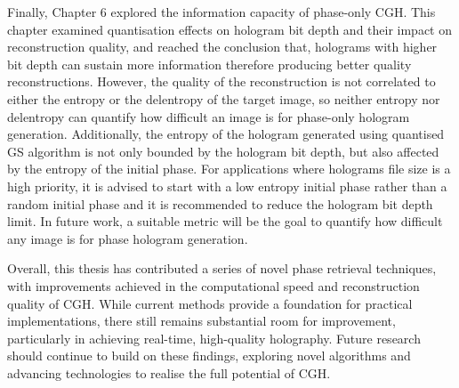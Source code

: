 Finally, Chapter 6 explored the information capacity of phase-only CGH. This chapter examined quantisation effects on hologram bit depth and their impact on reconstruction quality, and reached the conclusion that, holograms with higher bit depth can sustain more information therefore producing better quality reconstructions. However, the quality of the reconstruction is not correlated to either the entropy or the delentropy of the target image, so neither entropy nor delentropy can quantify how difficult an image is for phase-only hologram generation. Additionally, the entropy of the hologram generated using quantised GS algorithm is not only bounded by the hologram bit depth, but also affected by the entropy of the initial phase. For applications where holograms file size is a high priority, it is advised to start with a low entropy initial phase rather than a random initial phase and it is recommended to reduce the hologram bit depth limit. In future work, a suitable metric will be the goal to quantify how difficult any image is for phase hologram generation.

Overall, this thesis has contributed a series of novel phase retrieval techniques, with improvements achieved in the computational speed and reconstruction quality of CGH. While current methods provide a foundation for practical implementations, there still remains substantial room for improvement, particularly in achieving real-time, high-quality holography. Future research should continue to build on these findings, exploring novel algorithms and advancing technologies to realise the full potential of CGH.

